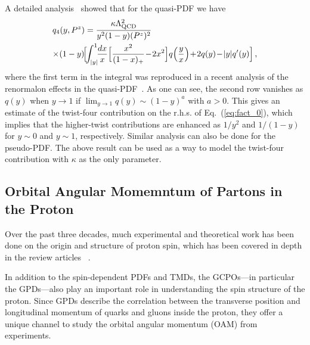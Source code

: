A detailed analysis~\cite{Braun:2018brg} showed that for the quasi-PDF we have
\begin{align}
	\label{t4-Qparallel}
	& {q}_4(y,P^z) =\frac{\kappa  \Lambda_{\rm QCD}^2}{y^2(1-y) (P^z)^2}\\
	&\hspace{-.2em}\times \hspace{-.2em}(1-y)\!\Big[\!\!
	\int_{|y|}^1 \!\!\frac{dx}{x} \Big[\frac{x^2}{(1-x)_+}\!-\!2x^2\Big]q\Big(\frac{y}{x}\Big)\!
	+\! 2q(y)\! -\! |y|q'(y) \Big]\,,\nn
\end{align}
where the first term in the integral was reproduced in a recent analysis of the renormalon effects in the quasi-PDF~\cite{Liu:2020rqi}. As one can see, the second row vanishes as $q(y)$ when $y\to1$ if $\lim_{y\to1}q(y)\sim (1-y)^a$ with $a>0$.
This gives an estimate of the twist-four contribution on the r.h.s. of Eq.~(\ref{eq:fact_0}), which  implies that the higher-twist contributions are enhanced as $1/y^2$ and $1/(1-y)$ for $y\sim 0$ and $y\sim 1$, respectively. Similar analysis can also be done for the pseudo-PDF.
The above result can be used as a way to model the twist-four contribution with $\kappa$ as the only parameter.

\subsection{Orbital Angular Momemntum of Partons in the Proton}
\label{sec:spin}

Over the past three decades, much experimental and theoretical
work has been done on the origin and structure of proton spin, which has been covered in depth in the review articles
~\cite{Filippone:2001ux,Bass:2004xa,Aidala:2012mv,Leader:2013jra,Ji:2016djn,Deur:2018roz,Ji:2020ena}.

In addition to the spin-dependent PDFs and TMDs, the GCPOs---in particular the GPDs---also play an important role in understanding the spin structure of the proton. Since GPDs describe the correlation between the transverse position and longitudinal momentum of quarks and gluons inside the proton, they offer a unique channel to study the orbital angular momentum (OAM) from experiments.

